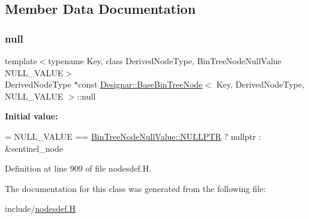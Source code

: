 \subsection{Member Data Documentation}
\mbox{\label{class_designar_1_1_base_bin_tree_node_a0ea0251169acae6e7943ccc54f66472a}} 
\subsubsection{\texorpdfstring{null}{null}}
{\footnotesize\ttfamily template$<$typename Key, class Derived\+Node\+Type, Bin\+Tree\+Node\+Null\+Value N\+U\+L\+L\+\_\+\+V\+A\+L\+UE$>$ \\
Derived\+Node\+Type $\ast$const \hyperlink{class_designar_1_1_base_bin_tree_node}{Designar\+::\+Base\+Bin\+Tree\+Node}$<$ Key, Derived\+Node\+Type, N\+U\+L\+L\+\_\+\+V\+A\+L\+UE $>$\+::null\hspace{0.3cm}{\ttfamily [static]}}

{\bfseries Initial value\+:}
\begin{DoxyCode}
=
    NULL\_VALUE == \hyperlink{namespace_designar_adc51778fc9415de368881abd254cca7cabf31abdbb1a298903e3a7f0edd0dcaf9}{BinTreeNodeNullValue::NULLPTR} ? nullptr : &sentinel\_node
\end{DoxyCode}


Definition at line 909 of file nodesdef.\+H.



The documentation for this class was generated from the following file\+:\begin{DoxyCompactItemize}
\item 
include/\hyperlink{nodesdef_8_h}{nodesdef.\+H}\end{DoxyCompactItemize}
